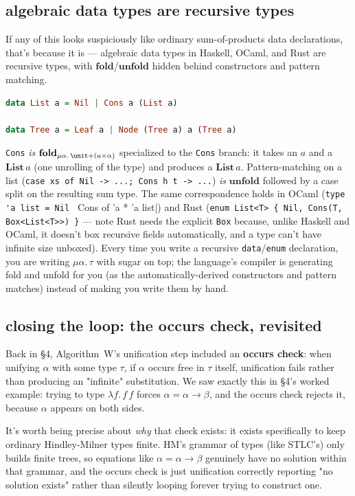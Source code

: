 \subsection{algebraic data types are recursive types}

If any of this looks suspiciously like ordinary sum-of-products data declarations, that's because it is — algebraic data types in Haskell, OCaml, and Rust are recursive types, with $\mathbf{fold}$/$\mathbf{unfold}$ hidden behind constructors and pattern matching.
\begin{lstlisting}[language=Haskell]
data List a = Nil | Cons a (List a)

data Tree a = Leaf a | Node (Tree a) a (Tree a)
\end{lstlisting}
\lstinline|Cons| \emph{is} $\mathbf{fold}_{\mu\alpha.\, \unit + (a\times\alpha)}$ specialized to the \lstinline|Cons| branch: it takes an $a$ and a $\mathbf{List}\,a$ (one unrolling of the type) and produces a $\mathbf{List}\,a$. Pattern-matching on a list (\lstinline|case xs of Nil -> ...; Cons h t -> ...|) \emph{is} $\mathbf{unfold}$ followed by a case split on the resulting sum type. The same correspondence holds in OCaml (\lstinline|type 'a list = Nil | Cons of 'a * 'a list|) and Rust (\lstinline|enum List<T> { Nil, Cons(T, Box<List<T>>) }| — note Rust needs the explicit \lstinline|Box| because, unlike Haskell and OCaml, it doesn't box recursive fields automatically, and a type can't have infinite size unboxed). Every time you write a recursive \lstinline|data|/\lstinline|enum| declaration, you are writing $\mu\alpha.\,\tau$ with sugar on top; the language's compiler is generating fold and unfold for you (as the automatically-derived constructors and pattern matches) instead of making you write them by hand.

\subsection{closing the loop: the occurs check, revisited}

Back in \S4, Algorithm~W's unification step included an \textbf{occurs check}: when unifying $\alpha$ with some type $\tau$, if $\alpha$ occurs free in $\tau$ itself, unification fails rather than producing an "infinite" substitution. We saw exactly this in \S4's worked example: trying to type $\lambda f.\,f\,f$ forces $\alpha = \alpha\to\beta$, and the occurs check rejects it, because $\alpha$ appears on both sides.

It's worth being precise about \emph{why} that check exists: it exists specifically to keep ordinary Hindley-Milner types finite. HM's grammar of types (like STLC's) only builds finite trees, so equations like $\alpha = \alpha\to\beta$ genuinely have no solution within that grammar, and the occurs check is just unification correctly reporting "no solution exists" rather than silently looping forever trying to construct one.


